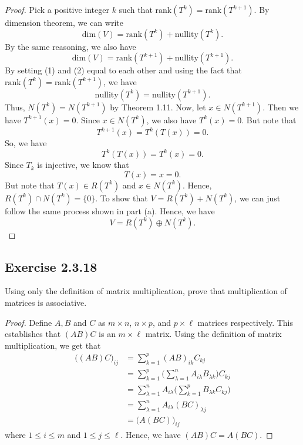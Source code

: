 \begin{enumerate}
\begin{proof}
            Pick a positive integer \( k  \) such that \( \text{rank}(T^{k }) = \text{rank}(T^{k+1})  \). By dimension theorem, we can write 
            \[  \text{dim}(V) = \text{rank}(T^{k }) + \text{nullity}(T^{k }). \tag{1}\] By the same reasoning, we also have
            \[  \text{dim}(V) = \text{rank}(T^{k+1}) + \text{nullity}(T^{k + 1 }). \tag{2} \] By setting (1) and (2) equal to each other and using the fact that \( \text{rank}(T^{k } ) = \text{rank}(T^{k+1}) \), we have
            \[  \text{nullity}(T^{k }) = \text{nullity}(T^{k+1}).  \]
            Thus, \( N(T^{k }) = N(T^{k+1}) \) by Theorem 1.11. Now, let \( x \in N(T^{k+1})  \). Then we have \( T^{k+1}(x) = 0  \). Since \( x \in N(T^{k }) \), we also have \( T^{k } (x) = 0  \). But note that 
            \[  T^{k+1}(x) = T^{k }(T(x)) = 0. \]
            So, we have
            \[  T^{k}(T(x)) = T^{k}(x) = 0.  \]
            Since \( {T}_{k} \) is injective, we know that 
            \[  T(x) = x = 0.   \]
            But note that \( T(x) \in R(T^{k})  \) and \( x \in N(T^{k}) \). Hence, \( R(T^{k}) \cap N(T^{k}) = \{ 0  \}  \).
            To show that \( V = R(T^{k}) + N(T^{k })   \), we can just follow the same process shown in part (a). Hence, we have 
            \[  V = R(T^{k }) \oplus N(T^{k }). \]
        \end{proof}
        \end{enumerate}

\subsection*{Exercise 2.3.18} Using only the definition of matrix multiplication, prove that multiplication of matrices is associative. 
\begin{proof}
   Define \( A, B    \) and \( C  \) as \( m \times n  \), \( n \times p  \), and \( p \times \ell  \) matrices respectively. This establishes that \( (AB) C  \) is an \( m \times \ell  \) matrix. Using the definition of matrix multiplication, we get that 
   \begin{align*}
       \Big( (AB) C  \Big)_{ij} &= \sum_{ k=1  }^{ p  } {(AB)}_{ik } {C}_{kj }  \\
                                &= \sum_{ k=1  }^{ p  } \Big( \sum_{ \lambda = 1  }^{ n } {A}_{i \lambda } {B}_{\lambda k  } \Big) {C}_{kj} \\
                                &= \sum_{ \lambda = 1  }^{ n  } {A}_{i \lambda } \Big( \sum_{ k=1  }^{ p  } {B}_{\lambda k } {C}_{ k j } \Big) \\
                                &= \sum_{ \lambda = 1  }^{ n  } {A}_{i \lambda } {(BC)}_{\lambda j } \\
                                &= \Big( A(BC)  \Big)_{ij}
   \end{align*}
   where \( 1 \leq i \leq m  \) and \( 1 \leq j \leq \ell  \). Hence, we have \( (AB)C = A(BC) \).
\end{proof}
